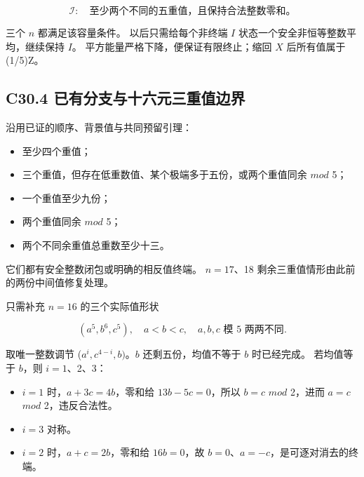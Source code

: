 \documentclass[11pt,a4paper]{article}
\newcommand{\tightlist}{\setlength{\itemsep}{0pt}\setlength{\parskip}{0pt}}
\theoremstyle{definition}
\numberwithin{equation}{section}
\begin{document}
\[
\mathcal I:\quad\text{至少两个不同的五重值，且保持合法整数零和。}
\]

{三个} {\ensuremath{n}} {都满足该容量条件。} {以后只需给每个非终端} {\ensuremath{I}} {状态一个安全非恒等整数平均，继续保持} {\ensuremath{I}。} {平方能量严格下降，便保证有限终止；缩回} {\ensuremath{X}} {后所有值属于} {(1/5)Z。}

\subsection*{\texorpdfstring{{C30.4} {已有分支与十六元三重值边界}}{C30.4 已有分支与十六元三重值边界}}\label{C30-h194}

{沿用已证的顺序、背景值与共同预留引理：}

\begin{itemize}
\tightlist
\item
  {至少四个重值；}
\item
  {三个重值，但存在低重数值、某个极端多于五份，或两个重值同余} {\ensuremath{mod}} {5；}
\item
  {一个重值至少九份；}
\item
  {两个重值同余} {\ensuremath{mod}} {5；}
\item
  {两个不同余重值总重数至少十三。}
\end{itemize}

{它们都有安全整数闭包或明确的相反值终端。} {\ensuremath{n=17}、18} {剩余三重值情形由此前的两份中间值修复处理。}

{只需补充} {\ensuremath{n=16}} {的三个实际值形状}

\[
(a^5,b^6,c^5),\quad a<b<c,
\quad a,b,c\text{ 模 5 两两不同}.
\]

{取唯一整数调节} {(\ensuremath{a^{i},c^{4-i},b)}。\ensuremath{b}} {还剩五份，均值不等于} {\ensuremath{b}} {时已经完成。} {若均值等于} {\ensuremath{b}，则} {\ensuremath{i=1}、2、3：}

\begin{itemize}
\tightlist
\item
  {\ensuremath{i=1}} {时，\ensuremath{a+3c=4b}，零和给} {\ensuremath{13b-5c=0}，所以} {\ensuremath{b=c}} {\ensuremath{mod}} {2，进而} {\ensuremath{a=c}} {\ensuremath{mod}} {2，违反合法性。}
\item
  {\ensuremath{i=3}} {对称。}
\item
  {\ensuremath{i=2}} {时，\ensuremath{a+c=2b}，零和给} {\ensuremath{16b=0}，故} {\ensuremath{b=0}、\ensuremath{a=-c}，是可逐对消去的终端。}
\end{itemize}
\end{document}
